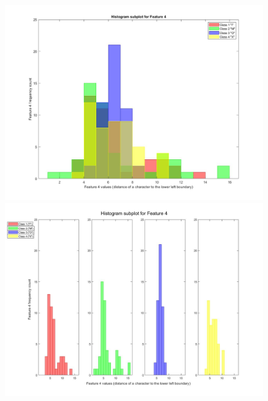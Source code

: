 \documentclass[a4paper,12pt]{article}
\begin{document}
\begin{figure}[H]
\centering
\includegraphics[scale=0.3]{q1pc_4.jpg}
\includegraphics[scale=0.3]{q1pcs_4.jpg}
\end{figure}
\pagebreak
\end{document}
